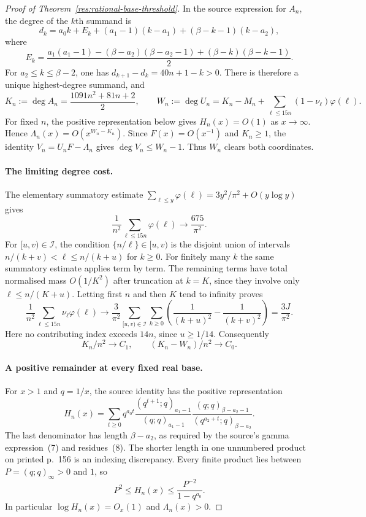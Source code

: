 \documentclass[11pt]{article}
\begin{document}
\begin{proof}[Proof of Theorem~\ref{res:rational-base-threshold}]
In the source expression for $A_n$, the degree of the $k$th summand is
\[
 d_k=a_0k+E_k+(a_1-1)(k-a_1)+(\beta-k-1)(k-a_2),
\]
where
\[
 E_k=\frac{a_1(a_1-1)-(\beta-a_2)(\beta-a_2-1)
                   +(\beta-k)(\beta-k-1)}2.
\]
For $a_2\le k\le\beta-2$, one has $d_{k+1}-d_k=40n+1-k>0$.
There is therefore a unique highest-degree summand, and
\[
 K_n:=\deg A_n=\frac{1091n^2+81n+2}{2},\qquad
 W_n:=\deg U_n=K_n-M_n+\sum_{\ell\le15n}(1-\nu_\ell)\varphi(\ell).
\]
For fixed $n$, the positive representation below gives $H_n(x)=O(1)$ as
$x\to\infty$.  Hence $\Lambda_n(x)=O(x^{W_n-K_n})$.
Since $F(x)=O(x^{-1})$ and $K_n\ge1$, the identity
$V_n=U_nF-\Lambda_n$ gives $\deg V_n\le W_n-1$.
Thus $W_n$ clears both coordinates.

\paragraph{The limiting degree cost.}
The elementary summatory estimate
$\sum_{\ell\le y}\varphi(\ell)=3y^2/\pi^2+O(y\log y)$ gives
\[
 \frac1{n^2}\sum_{\ell\le15n}\varphi(\ell)\longrightarrow\frac{675}{\pi^2}.
\]
For $[u,v)\in\mathcal I$, the condition $\{n/\ell\}\in[u,v)$ is the
disjoint union of intervals
$n/(k+v)<\ell\le n/(k+u)$ for $k\ge0$.
For finitely many $k$ the same summatory estimate applies term by term.
The remaining terms have total normalised mass $O(1/K^2)$ after truncation
at $k=K$, since they involve only $\ell\le n/(K+u)$.
Letting first $n$ and then $K$ tend to infinity proves
\[
 \frac1{n^2}\sum_{\ell\le15n}\nu_\ell\varphi(\ell)
 \longrightarrow\frac3{\pi^2}
 \sum_{[u,v)\in\mathcal I}\sum_{k\ge0}
 \left(\frac1{(k+u)^2}-\frac1{(k+v)^2}\right)=\frac{3J}{\pi^2}.
\]
Here no contributing index exceeds $14n$, since $u\ge1/14$.
Consequently
\[
 K_n/n^2\longrightarrow C_1,\qquad
 (K_n-W_n)/n^2\longrightarrow C_0.
\]

\paragraph{A positive remainder at every fixed real base.}
For $x>1$ and $q=1/x$, the source identity has the positive representation
\[
 H_n(x)=\sum_{t\ge0}q^{a_0t}
 \frac{(q^{t+1};q)_{a_1-1}}{(q;q)_{a_1-1}}
 \frac{(q;q)_{\beta-a_2-1}}{(q^{a_2+t};q)_{\beta-a_2}}.
\]
The last denominator has length $\beta-a_2$, as required by the source's
gamma expression~(7) and residues~(8).  The shorter length in one unnumbered
product on printed p.~156 is an indexing discrepancy.
Every finite product lies between $P=(q;q)_\infty>0$ and $1$, so
\[
 P^2\le H_n(x)\le\frac{P^{-2}}{1-q^{a_0}}.
\]
In particular $\log H_n(x)=O_x(1)$ and $\Lambda_n(x)>0$.


\end{proof}
\end{document}
